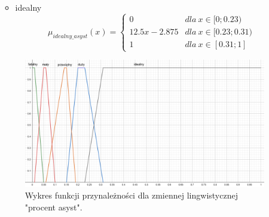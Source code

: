 \documentclass{classrep}
\begin{document}
\begin{enumerate}
\begin{itemize}
\begin{equation}
        \end{equation}
        \item idealny
        \begin{equation}
            \mu_{idealny\_asyst}(x) = \left\{\begin{matrix} 0 & dla \: x\in [0;0.23) \\ 12.5x - 2.875 & dla \: x\in[0.23;0.31) \\ 1 & dla \: x\in [0.31; 1] \end{matrix}\right.
        \end{equation}
    \end{itemize}
     \begin{figure}[H]
    \centering
    \includegraphics[width=14cm]{wykres_pr_asyst.png}
    \caption{Wykres funkcji przynależności dla zmiennej lingwistycznej "procent asyst".}
    \label{rysunek:procent_asyst}
\end{figure}
\end{enumerate}
\end{document}
